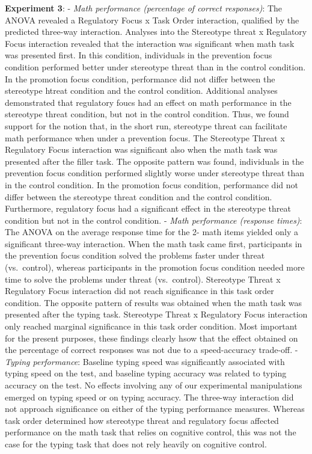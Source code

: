 \documentclass[
  doc, a4paper]{apa7}
\begin{document}
\textbf{Experiment 3}:
- \emph{Math performance (percentage of correct responses)}: The ANOVA revealed a Regulatory Focus x Task Order interaction, qualified by the predicted three-way interaction. Analyses into the Stereotype threat x Regulatory Focus interaction revealed that the interaction was significant when math task was presented first. In this condition, individuals in the prevention focus condition performed better under stereotype threat than in the control condition. In the promotion focus condition, performance did not differ between the stereotype htreat condition and the control condition. Additional analyses demonstrated that regulatory foucs had an effect on math performance in the stereotype threat condition, but not in the control condition. Thus, we found support for the notion that, in the short run, stereotype threat can facilitate math performance when under a prevention focus. The Stereotype Threat x Regulatory Focus interaction was significant also when the math task was presented after the filler task. The opposite pattern was found, individuals in the prevention focus condition performed slightly worse under stereotype threat than in the control condition. In the promotion focus condition, performance did not differ between the stereotype threat condition and the control condition. Furthermore, regulatory focus had a significant effect in the stereotype threat condition but not in the control condition.
- \emph{Math performance (response times)}: The ANOVA on the average response time for the 2- math items yielded only a significant three-way interaction. When the math task came first, participants in the prevention focus condition solved the problems faster under threat (vs.~control), whereas participants in the promotion focus condition needed more time to solve the problems under threat (vs.~control). Stereotype Threat x Regulatory Focus interaction did not reach significance in this task order condition. The opposite pattern of results was obtained when the math task was presented after the typing task. Stereotype Threat x Regulatory Focus interaction only reached marginal significance in this task order condition. Most important for the present purposes, these findings clearly hsow that the effect obtained on the percentage of correct responses was not due to a speed-accuracy trade-off.
- \emph{Typing performance}: Baseline typing speed was significantly associated with typing speed on the test, and baseline typing accuracy was related to typing accuracy on the test. No effects involving any of our experimental manipulations emerged on typing speed or on typing accuracy. The three-way interaction did not approach significance on either of the typing performance measures. Whereas task order determined how stereotype threat and regulatory focus affected performance on the math task that relies on cognitive control, this was not the case for the typing task that does not rely heavily on cognitive control.
\end{document}
